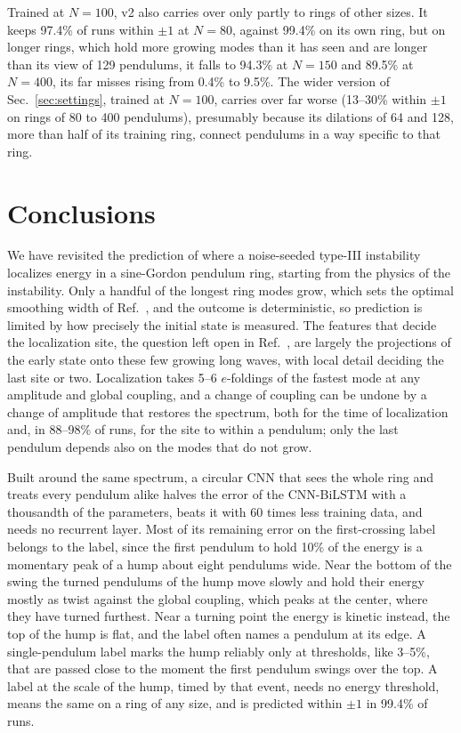 \documentclass[11pt]{article}
\begin{document}
Trained at $N=100$, v2 also carries over only partly to rings of other sizes. It keeps 97.4\% of runs within $\pm1$ at $N=80$, against 99.4\% on its own ring, but on longer rings, which hold more growing modes than it has seen and are longer than its view of 129 pendulums, it falls to 94.3\% at $N=150$ and 89.5\% at $N=400$, its far misses rising from 0.4\% to 9.5\%. The wider version of Sec.~\ref{sec:settings}, trained at $N=100$, carries over far worse (13--30\% within $\pm1$ on rings of 80 to 400 pendulums), presumably because its dilations of 64 and 128, more than half of its training ring, connect pendulums in a way specific to that ring.

\FloatBarrier
\section{Conclusions}
\label{sec:conclusions}

We have revisited the prediction of where a noise-seeded type-III instability localizes energy in a sine-Gordon pendulum ring, starting from the physics of the instability. Only a handful of the longest ring modes grow, which sets the optimal smoothing width of Ref.~\cite{mittal2026jand}, and the outcome is deterministic, so prediction is limited by how precisely the initial state is measured. The features that decide the localization site, the question left open in Ref.~\cite{mittal2026jand}, are largely the projections of the early state onto these few growing long waves, with local detail deciding the last site or two. Localization takes 5--6 $e$-foldings of the fastest mode at any amplitude and global coupling, and a change of coupling can be undone by a change of amplitude that restores the spectrum, both for the time of localization and, in 88--98\% of runs, for the site to within a pendulum; only the last pendulum depends also on the modes that do not grow.

Built around the same spectrum, a circular CNN that sees the whole ring and treats every pendulum alike halves the error of the CNN-BiLSTM with a thousandth of the parameters, beats it with 60 times less training data, and needs no recurrent layer. Most of its remaining error on the first-crossing label belongs to the label, since the first pendulum to hold 10\% of the energy is a momentary peak of a hump about eight pendulums wide. Near the bottom of the swing the turned pendulums of the hump move slowly and hold their energy mostly as twist against the global coupling, which peaks at the center, where they have turned furthest. Near a turning point the energy is kinetic instead, the top of the hump is flat, and the label often names a pendulum at its edge. A single-pendulum label marks the hump reliably only at thresholds, like 3--5\%, that are passed close to the moment the first pendulum swings over the top. A label at the scale of the hump, timed by that event, needs no energy threshold, means the same on a ring of any size, and is predicted within $\pm1$ in 99.4\% of runs.
\end{document}
